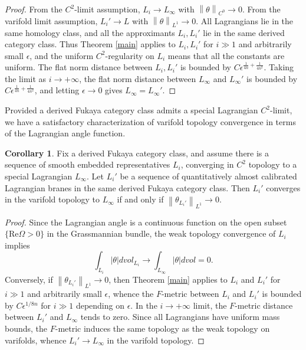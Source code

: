 \documentclass[a4paper]{article}
\theoremstyle{definition}
\newtheorem{cor}[thm]{Corollary}
\newcommand{\norm}[1]{\left\lVert#1\right\rVert}
\begin{document}
\begin{proof}
From the $C^2$-limit assumption, $L_i\to L_\infty$ with $\norm{\theta}_{C^0}\to 0$. From the varifold limit assumption, $L_i'\to L$ with $\norm{\theta}_{L^1}\to 0$. All Lagrangians lie in the same homology class, and all the approximants $L_i, L_i'$ lie in the same derived category class. Thus Theorem \ref{main} applies to $L_i, L_i'$ for $i\gg 1$ and arbitrarily small $\epsilon$, and the uniform $C^2$-regularity on $L_i$ means that all the constants are uniform. The flat norm distance between $L_i, L_i'$ is bounded by $C\epsilon^{ \frac{1}{4n}+ \frac{1}{4n^2}  }$. Taking the limit as $i\to +\infty$, the flat norm distance between $L_\infty$ and $L_\infty'$ is bounded by $C\epsilon^{ \frac{1}{4n}+ \frac{1}{4n^2}  }$, and letting $\epsilon\to 0$ gives $L_\infty=L_\infty'$. 
\end{proof}





Provided a derived Fukaya category class admits a special Lagrangian $C^2$-limit, we have a satisfactory characterization of varifold topology convergence in terms of the Lagrangian angle function.



\begin{cor}
Fix a derived Fukaya category class, and assume there is a sequence of smooth embedded representatives $L_i$, converging in $C^2$ topology to a special Lagrangian $L_\infty$. Let $L_i'$ be a sequence of quantitatively almost calibrated Lagrangian branes in the same derived Fukaya category class. Then $L_i'$ converges in the varifold topology to $L_\infty$ if and only if $\norm{\theta_{L_i'}}_{L^1}\to 0$.


	
\end{cor}






\begin{proof}
Since the Lagrangian angle is a continuous function on the open subset $\{ \text{Re}\Omega>0  \}$ in the Grassmannian bundle, the weak topology convergence of $L_i$ implies 
\[
\int_{L_i} |\theta| dvol_{L_i}\to \int_{L_\infty} |\theta| dvol =0. 
\]
Conversely, if $\norm{\theta_{L_i'}}_{L^1}\to 0$, then Theorem \ref{main} applies to $L_i$ and $L_i'$ for $i\gg 1$ and arbitrarily small $\epsilon$, whence the $F$-metric between $L_i$ and $L_i'$ is bounded by $C\epsilon^{1/8n}$ for $i\gg 1$ depending on $\epsilon$. In the $i\to +\infty$ limit, the $F$-metric distance between $L_i'$ and $L_\infty$ tends to zero. Since all Lagrangians have uniform mass bounds, the $F$-metric induces the same topology as the weak topology on varifolds, whence $L_i'\to L_\infty$ in the varifold topology.
\end{proof}
\end{document}
